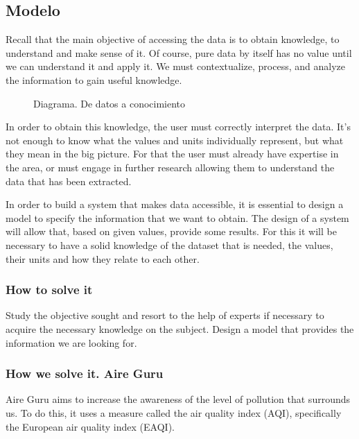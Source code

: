 \subsection{Modelo}

Recall that the main objective of accessing the data is to obtain knowledge, to understand and make sense of it. Of course, 
pure data by itself has no value until we can understand it and apply it. We must contextualize, process, and analyze the 
information to gain useful knowledge. \\
    
\begin{figure}[ht]
    \centering 
      \caption{Diagrama. De datos a conocimiento}
    \end{figure}
 
    In order to obtain this knowledge, the user must correctly interpret the data. It's not enough to know what the values and 
    units individually represent, but what they mean in the big picture. For that the user must already have expertise in the 
    area, or must engage in further research allowing them to understand the data that has been extracted.
     
    In order to build a system that makes data accessible, it is essential to design a model to specify the
    information that we want to obtain. The design of a system will allow that, based on given values, provide some results.
    For this it will be necessary to have a solid knowledge of the dataset that is needed, the values,
    their units and how they relate to each other.


\subsubsection{How to solve it} 
Study the objective sought and resort to the help of experts if necessary to acquire the necessary knowledge
on the subject. Design a model that provides the information we are looking for.

\subsubsection{How we solve it. Aire Guru} 
Aire Guru aims to increase the awareness of the level of pollution that surrounds us. To do this, it uses a measure called
the air quality index (AQI), specifically the European air quality index (EAQI).


